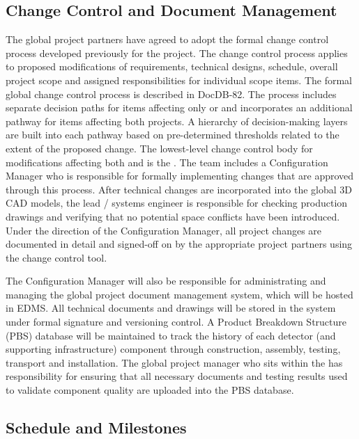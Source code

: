 \subsection{Change Control and Document Management}
\label{sec:dune_changecontrol}

The global project partners have agreed to adopt the formal change
control process developed previously for the  project.
The change control process applies to proposed modifications of
requirements, technical designs, schedule, overall project scope and
assigned responsibilities for individual scope items.  The formal
global change control process is described in  DocDB-82.
The process includes separate decision paths for items affecting only
 or  and incorporates an additional pathway
for items affecting both projects.  A hierarchy of decision-making
layers are built into each pathway based on pre-determined thresholds
related to the extent of the proposed change.  The lowest-level change
control body for modifications affecting both  and
 is the .  The  team includes a
Configuration Manager who is responsible for formally implementing
changes that are approved through this process.  After technical
changes are incorporated into the global 3D CAD models, the lead
/ systems engineer is responsible for checking production
drawings and verifying that no potential space conflicts have been
introduced.  Under the direction of the Configuration Manager, all
project changes are documented in detail and signed-off on by the
appropriate project partners using the  change control tool.

The Configuration Manager will also be responsible for administrating
and managing the global project document management system, which will
be hosted in EDMS.  All technical documents and drawings will be
stored in the  system under formal signature and
versioning control.  A Product Breakdown Structure (PBS) database will
be maintained to track the history of each detector (and supporting
infrastructure) component through construction, assembly, testing,
transport and installation.  The global project  manager who
sits within the  has responsibility for ensuring that all
necessary documents and testing results used to validate component
quality are uploaded into the PBS database.

\subsection{Schedule and Milestones}
\label{sec:dune_schedule}

